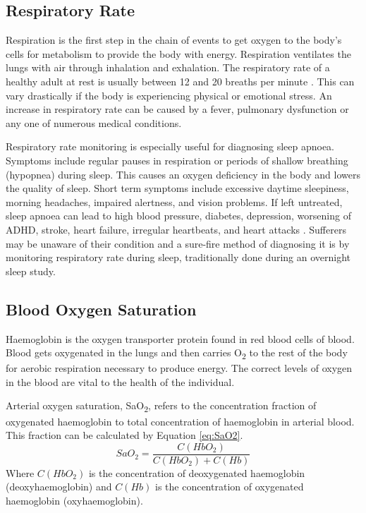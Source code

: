 \subsection{Respiratory Rate}
Respiration is the first step in the chain of events to get oxygen to the body's cells for metabolism to provide the body with energy. Respiration ventilates the lungs with air through inhalation and exhalation. The respiratory rate of a healthy adult at rest is usually between 12 and 20 breaths per minute \citep{medscapeBreathingRate}. This can vary drastically if the body is experiencing physical or emotional stress. An increase in respiratory rate can be caused by a fever, pulmonary dysfunction or any one of numerous medical conditions.

\medskip
Respiratory rate monitoring is especially useful for diagnosing sleep apnoea. Symptoms include regular pauses in respiration or periods of shallow breathing (hypopnea) during sleep. This causes an oxygen deficiency in the body and lowers the quality of sleep. Short term symptoms include excessive daytime sleepiness, morning headaches, impaired alertness, and vision problems. If left untreated, sleep apnoea can lead to high blood pressure, diabetes, depression, worsening of ADHD, stroke, heart failure, irregular heartbeats, and heart attacks \citep{webMDSleepApnoea}. Sufferers may be unaware of their condition and a sure-fire method of diagnosing it is by monitoring respiratory rate during sleep, traditionally done during an overnight sleep study.

\subsection{Blood Oxygen Saturation}

Haemoglobin is the oxygen transporter protein found in red blood cells of blood. Blood gets oxygenated in the lungs and then carries O\textsubscript{2} to the rest of the body for aerobic respiration necessary to produce energy. The correct levels of oxygen in the blood are vital to the health of the individual.

\medskip
Arterial oxygen saturation, SaO\textsubscript{2}, refers to the concentration fraction of oxygenated haemoglobin to total concentration of haemoglobin in arterial blood. This fraction can be calculated by Equation \ref{eq:SaO2}.
\begin{equation}
\label{eq:SaO2}
SaO_2  =  \frac{C(HbO_2)}{C(HbO_2)+C(Hb)}
\end{equation}
Where $C(HbO_2)$ is the concentration of deoxygenated haemoglobin (deoxyhaemoglobin) and $C(Hb)$ is the concentration of oxygenated haemoglobin (oxyhaemoglobin).

